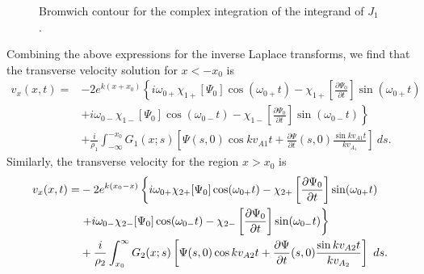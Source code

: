 \documentclass[12pt, draft]{../style-files/ociamthesis}
\begin{document}
\begin{figure}
	\centering
	\caption{Bromwich contour for the complex integration of the integrand of $J_1$.}
	\label{fig: brom cont incomp 2}
\end{figure}
Combining the above expressions for the inverse Laplace transforms, we find that the transverse velocity solution for $x<-x_0$ is
\begin{align}
v_x(x, t) = &-2 e^{k(x+x_0)} \left\{ i\omega_{0+}\chi_{1+}[\Psi_0] \cos(\omega_{0+} t) - \chi_{1+}\left[ \frac{\partial \Psi_0}{\partial t} \right] \sin(\omega_{0+} t) \right. \\
&\left. + i\omega_{0-}\chi_{1-}[\Psi_0] \cos(\omega_{0-} t) - \chi_{1-}\left[ \frac{\partial \Psi_0}{\partial t} \right] \sin(\omega_{0-} t) \right\} \\
&+ \frac{i}{\rho_1} \int_{-\infty}^{-x_0} G_1(x;s) \left[ \Psi(s, 0) \cos{kv_{A1}t} + \frac{\partial \Psi}{\partial t}(s, 0) \frac{\sin{kv_{A1}t}}{kv_{A_1}} \right]~ds.
\end{align}
Similarly, the transverse velocity for the region $x>x_0$ is
\begin{align}
v_x(x, t) = &-2 e^{k(x_0 - x)} \left\{ i\omega_{0+}\chi_{2+}[\Psi_0] \cos(\omega_{0+} t) - \chi_{2+}\left[ \frac{\partial \Psi_0}{\partial t} \right] \sin(\omega_{0+} t) \right. \notag \\
&\left. + i\omega_{0-}\chi_{2-}[\Psi_0] \cos(\omega_{0-} t) - \chi_{2-}\left[ \frac{\partial \Psi_0}{\partial t} \right] \sin(\omega_{0-} t) \right\} \notag \\
& + \frac{i}{\rho_2} \int_{x_0}^{\infty} G_2(x;s) \left[ \Psi(s, 0) \cos{kv_{A2}t} + \frac{\partial \Psi}{\partial t}(s, 0) \frac{\sin{kv_{A2}t}}{kv_{A_2}} \right]~ds.
\end{align}
\end{document}
